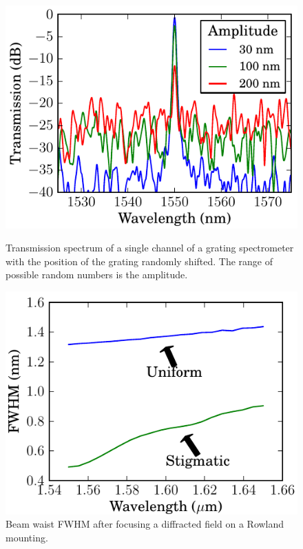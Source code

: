 \documentclass[12pt,twoside,english]{book}
\renewcommand{\~}{\perispomeni}%
\numberwithin{equation}{section}
\numberwithin{figure}{section}
\begin{document}
\begin{figure}[h]
    \begin{minipage}[t]{0.48\textwidth}
    \includegraphics{random-offline-test.pdf}
    \caption{Transmission spectrum of a single channel of a grating spectrometer with the position of the grating randomly shifted. The range of possible random numbers is the amplitude.}
    \label{fig:defect simulation}
    \end{minipage}
    \hfill
    \begin{minipage}[t]{0.48\textwidth}
    \includegraphics{graphs/aberrationComp.pdf}
    \caption{Beam waist FWHM after focusing a diffracted field on a Rowland mounting.}
	\label{fig:stigmatic comparison graph}
    \end{minipage}
\end{figure}
\end{document}
